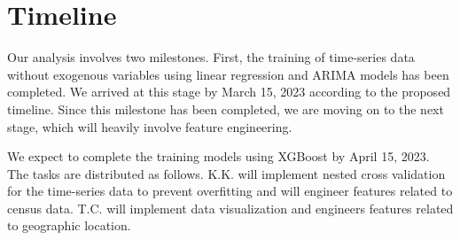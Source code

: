\documentclass[prl,aps,superscriptaddress,twocolumn,10pt,nolongbibliography]{revtex4-2}
\begin{document}
\section{Timeline}
Our analysis involves two milestones. 
First, the training of time-series data without exogenous variables using linear regression and ARIMA models has been completed.
We arrived at this stage by March 15, 2023 according to the proposed timeline.
Since this milestone has been completed, we are moving on to the next stage, which will heavily involve feature engineering.

We expect to complete the training models using XGBoost by April 15, 2023. 
The tasks are distributed as follows. 
K.K. will implement nested cross validation for the time-series data to prevent overfitting and will engineer features related to census data.
T.C. will implement data visualization and engineers features related to geographic location.

{}
\end{document}
